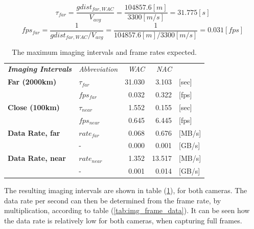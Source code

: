 \begin{equation}\label{eq:imaging_interval_calc}
\tau_{far} = \frac{gdist_{far,WAC}}{V_{avg}} = \frac{104857.6[m]}{3300[m/s]} = 31.775 [s]
\end{equation}
\begin{equation}\label{eq:imaging_rate_calc}
fps_{far} = \frac{1}{gdist_{far,WAC}/V_{avg}} = \frac{1}{104857.6[m]/3300[m/s]} = 0.031 [fps]
\end{equation}
\begin{table}[htb!]
  \centering
\begin{tabular}{l|l|r|r|l}
\textit{\textbf{Imaging Intervals}} & \textit{Abbreviation} & \multicolumn{1}{r}{\textit{WAC}} & \multicolumn{1}{r}{\textit{NAC}} &  \bigstrut[b]\\
\cline{1-4}\textbf{Far (2000km)} & $\tau_{far}$ & 31.030 & 3.103 & [sec] \bigstrut[t]\\
      & $fps_{far}$ & 0.032 & 0.322 & [fps] \bigstrut[b]\\
\cline{1-4}\textbf{Close (100km)} & $\tau_{near}$ & 1.552 & 0.155 & [sec] \bigstrut[t]\\
      & $fps_{near}$ & 0.645 & 6.445 & [fps] \bigstrut[b]\\
\cline{1-4}\textbf{Data Rate, far} & $rate_{far}$ & 0.068 & 0.676 & [MB/s] \bigstrut[t]\\
\textbf{} & -     & 0.000 & 0.001 & [GB/s] \bigstrut[b]\\
\cline{2-4}\textbf{Data Rate, near} & $rate_{near}$ & 1.352 & 13.517 & [MB/s] \bigstrut[t]\\
\textbf{} & -     & 0.001 & 0.014 & [GB/s] \\
\end{tabular}%
      \caption{The maximum imaging intervals and frame rates expected.}
  \label{tab:imaging_interval}%
\end{table}%
The resulting imaging intervals are shown in table (\ref{tab:imaging_interval}), for both cameras. The data rate per second can then be determined from the frame rate, by multiplication, according to table (\ref{tab:img_frame_data}). It can be seen how the data rate is relatively low for both cameras, when capturing full frames.

